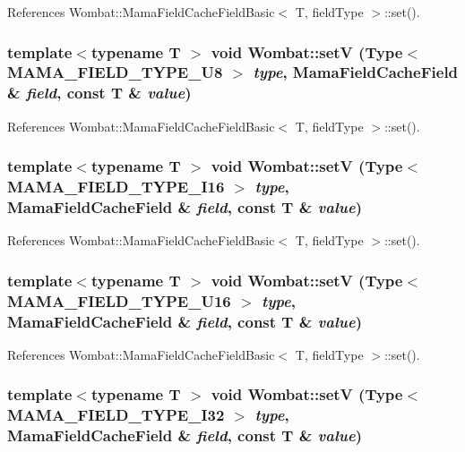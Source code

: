 References Wombat::MamaFieldCacheFieldBasic$<$ T, fieldType $>$::set().\hypertarget{namespaceWombat_a21353378eb961317cf15c2f48bc83b6a}{
\subsubsection[{setV}]{\setlength{\rightskip}{0pt plus 5cm}template$<$typename T $>$ void Wombat::setV (Type$<$ MAMA\_\-FIELD\_\-TYPE\_\-U8 $>$ {\em type}, \/  MamaFieldCacheField \& {\em field}, \/  const T \& {\em value})}}
\label{namespaceWombat_a21353378eb961317cf15c2f48bc83b6a}


References Wombat::MamaFieldCacheFieldBasic$<$ T, fieldType $>$::set().\hypertarget{namespaceWombat_a0bb174c4622f1745a15c8bfc94b7509b}{
\subsubsection[{setV}]{\setlength{\rightskip}{0pt plus 5cm}template$<$typename T $>$ void Wombat::setV (Type$<$ MAMA\_\-FIELD\_\-TYPE\_\-I16 $>$ {\em type}, \/  MamaFieldCacheField \& {\em field}, \/  const T \& {\em value})}}
\label{namespaceWombat_a0bb174c4622f1745a15c8bfc94b7509b}


References Wombat::MamaFieldCacheFieldBasic$<$ T, fieldType $>$::set().\hypertarget{namespaceWombat_a099b99c985108022be117de88751d717}{
\subsubsection[{setV}]{\setlength{\rightskip}{0pt plus 5cm}template$<$typename T $>$ void Wombat::setV (Type$<$ MAMA\_\-FIELD\_\-TYPE\_\-U16 $>$ {\em type}, \/  MamaFieldCacheField \& {\em field}, \/  const T \& {\em value})}}
\label{namespaceWombat_a099b99c985108022be117de88751d717}


References Wombat::MamaFieldCacheFieldBasic$<$ T, fieldType $>$::set().\hypertarget{namespaceWombat_a5cd88cd187fe6d270617d95635298caa}{
\subsubsection[{setV}]{\setlength{\rightskip}{0pt plus 5cm}template$<$typename T $>$ void Wombat::setV (Type$<$ MAMA\_\-FIELD\_\-TYPE\_\-I32 $>$ {\em type}, \/  MamaFieldCacheField \& {\em field}, \/  const T \& {\em value})}}
\label{namespaceWombat_a5cd88cd187fe6d270617d95635298caa}


